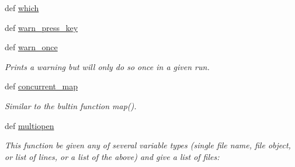 \begin{DoxyCompactItemize}
def \hyperlink{namespaceforcebalance_1_1nifty_aa1ff334c4b4e30e91978b91d9a9ec065}{which}
\item 
def \hyperlink{namespaceforcebalance_1_1nifty_abb8f59044961a12588e0653c2baa8b01}{warn\-\_\-press\-\_\-key}
\item 
def \hyperlink{namespaceforcebalance_1_1nifty_a26e563ec71ed229c30f3d61d3448c8f1}{warn\-\_\-once}
\begin{DoxyCompactList}\small\item\em \-Prints a warning but will only do so once in a given run. \end{DoxyCompactList}\item 
def \hyperlink{namespaceforcebalance_1_1nifty_a2fc81730e7efa7d138dd86f733507bfc}{concurrent\-\_\-map}
\begin{DoxyCompactList}\small\item\em \-Similar to the bultin function map(). \end{DoxyCompactList}\item 
def \hyperlink{namespaceforcebalance_1_1nifty_a64b7c6ca7afa1c11681f5c2897c55cc3}{multiopen}
\begin{DoxyCompactList}\small\item\em \-This function be given any of several variable types (single file name, file object, or list of lines, or a list of the above) and give a list of files\-: \end{DoxyCompactList}\end{DoxyCompactItemize}

